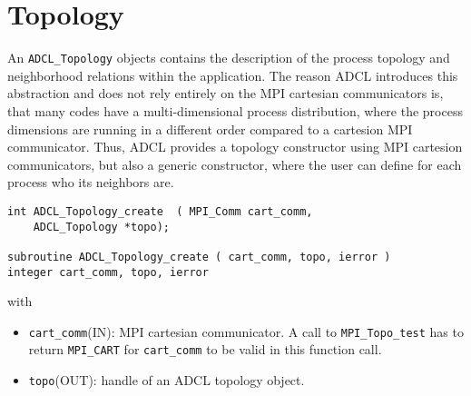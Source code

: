 \section{Topology}

An {\tt ADCL\_Topology} objects contains the description of the process topology and neighborhood relations within the application. The reason ADCL introduces this abstraction and does not rely entirely on the MPI cartesian communicators is, that many codes have a multi-dimensional process distribution, where the process dimensions are running in a different order compared to a cartesion MPI communicator. Thus, ADCL provides a topology constructor using MPI cartesion communicators, but also a generic constructor, where the user can define for each process who its neighbors are.

\begin{verbatim}
int ADCL_Topology_create  ( MPI_Comm cart_comm, 
    ADCL_Topology *topo);

subroutine ADCL_Topology_create ( cart_comm, topo, ierror )
integer cart_comm, topo, ierror
\end{verbatim}
with
\begin{itemize}
\item {\tt cart\_comm}(IN): MPI cartesian communicator. A call to {\tt MPI\_Topo\_test} has to return {\tt MPI\_CART} for {\tt cart\_comm} to be valid in this function call.
\item {\tt topo}(OUT): handle of an ADCL topology object. 
\end{itemize}

